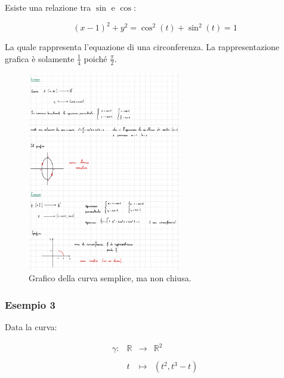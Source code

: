 \documentclass[a4paper]{article}
\begin{document}
	\noindent
	Esiste una relazione tra $\sin$ e $\cos$:
	
	\begin{equation*}
		\left(x-1\right)^{2} + y^{2} = \cos^{2}\left(t\right) + \sin^{2}\left(t\right) = 1
	\end{equation*}

	\noindent
	La quale rappresenta l'equazione di una circonferenza. La rappresentazione grafica è solamente $\frac{1}{4}$ poiché $\frac{\pi}{2}$.
	
	\begin{figure}[!htp]
		\centering
		\includegraphics[width=0.6\textwidth]{img/curva_semplice_ex1.pdf}
		\caption{Grafico della curva semplice, ma non chiusa.}
	\end{figure}

	\newpage
	
	\subsubsection[Esempio 3]{\textcolor{Green4}{Esempio 3}}
	
	Data la curva:
	
	\begin{equation*}
		\begin{array}{llll}
			\gamma:	& \mathbb{R}	& \longrightarrow	& \mathbb{R}^{2} \\
			&&& \\
			& t						& \longmapsto		& \left(t^{2}, t^{3} - t\right)
		\end{array}
	\end{equation*}
\end{document}
